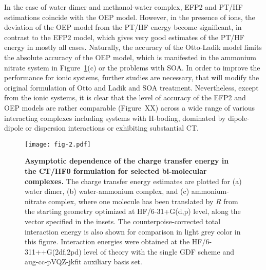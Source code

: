In the case of water dimer and methanol-water complex, EFP2 and PT/HF estimations
coincide with the OEP model. However, in the presence of ions, 
the deviation of the OEP model from the PT/HF energy 
become significant, in contrast to the EFP2 model, which gives very good estimates
of the PT/HF energy in mostly all cases.
Naturally, the accuracy of the Otto\hyp{}Ladik model limits the absolute accuracy
of the OEP model, which is manifested in the ammonium nitrate system
in Figure~\ref{f:fig-2}(c) or the problems with SOA. 
In order to improve the performance for ionic systems,
further studies are necessary, that will modify the original formulation
of Otto and Ladik and SOA treatment. Nevertheless, except from the ionic systems,
it is clear that the level of accuracy of the EFP2 and OEP models are rather comparable
(Figure~XX) across a wide range of various interacting complexes including 
systems with H-boding, dominated by dipole-dipole or dispersion interactions or 
exhibiting substantial CT.
%
\begin{figure}[h]
\texttt{[image: fig-2.pdf]}
\caption{\label{f:fig-2} {\bf Asymptotic dependence of the charge transfer energy
in the CT/HF0 formulation for selected bi\hyp{}molecular complexes.} 
The charge transfer energy estimates are plotted for 
(a) water dimer, 
(b) water\hyp{}ammonium complex, and 
(c) ammonium\hyp{}nitrate complex,
where one molecule has been translated by $R$ from the starting geometry
optimized at HF/6-31+G(d,p) level,
along the vector specified in the insets.
The counterpoise\hyp{}corrected total interaction energy
is also shown for comparison in light grey color in this figure.
Interaction energies were obtained at the HF/6-311++G(2df,2pd) level of theory
with the single GDF scheme and aug-cc-pVQZ-jkfit auxiliary basis set.
} 
\end{figure}
%

